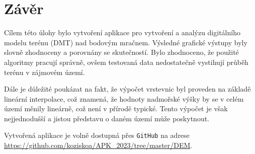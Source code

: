 \chapter*{Závěr}

\par Cílem této úlohy bylo vytvoření aplikace pro vytvoření a analýzu digitálního modelu terénu (DMT) nad bodovým mračnem. Výsledné grafické výstupy byly slovně zhodnoceny a porovnány se skutečností. Bylo zhodnoceno, že použité algoritmy pracují správně, ovšem testovaná data nedostatečně vystihují průběh terénu v zájmovém území. 
\par Dále je důležité poukázat na fakt, že výpočet vrstevnic byl proveden na základě lineární interpolace, což znamená, že hodnoty nadmořské výšky by se v celém území měnily lineárně, což není v přírodě typické. Tento výpočet je však nejjednodušší a jistou představu o daném území může poskytnout. 
\par Vytvořená aplikace je volně dostupná přes \verb|GitHub| na adrese \url{https://github.com/koziskoa/APK_2023/tree/master/DEM}.
